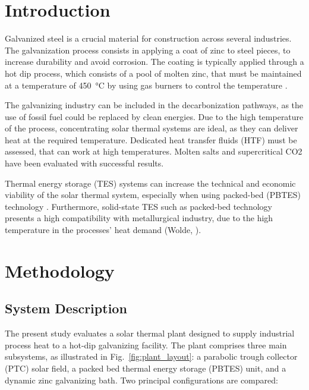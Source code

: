 \documentclass[11pt,review,3p]{elsarticle}
\newcommand{\nomenclaturebox}{%
  \begin{table}[!t] %
    \centering
    \setlength{\fboxsep}{5pt} %
    \doublebox{%
      \begin{minipage}{\textwidth}
        \begin{multicols}{2} %
          \printnomenclature
        \end{multicols}
      \end{minipage}
    }
  \end{table}
}
\begin{document}
\linenumbers


\nomenclaturebox

\section{Introduction}
\label{sec:Intro}
Galvanized steel is a crucial material for construction across several industries. The galvanization process consists in applying a coat of zinc to steel pieces, to increase durability and avoid corrosion. The coating is typically applied through a hot dip process, which consists of a pool of molten zinc, that must be maintained at a temperature of \SI{450}{\celsius} by using gas burners to control the temperature \cite{Blakey2004-sl}.

The galvanizing industry can be included in the decarbonization pathways, as the use of fossil fuel could be replaced by clean energies. Due to the high temperature of the process, concentrating solar thermal systems are ideal, as they can deliver heat at the required temperature. Dedicated heat transfer fluids (HTF) must be assessed, that can work at high temperatures. Molten salts \cite{Bonini2024-za} and supercritical CO2 \cite{Battisti2022-nw} have been evaluated with successful results.

Thermal energy storage (TES) systems can increase the technical and economic viability of the solar thermal system, especially when using packed-bed (PBTES) technology \cite{Battisti2021-wv}. Furthermore, solid-state TES such as packed-bed technology presents a high compatibility with metallurgical industry, due to the high temperature in the processes' heat demand (Wolde, \cite{Wolde2024-dm}).

\section{Methodology}
\label{sec:Methodology}

\subsection{System Description}
\label{sec:sys_desc}

The present study evaluates a solar thermal plant designed to supply industrial process heat to a hot-dip galvanizing facility. The plant comprises three main subsystems, as illustrated in Fig.~\ref{fig:plant_layout}: a parabolic trough collector (PTC) solar field, a packed bed thermal energy storage (PBTES) unit, and a dynamic zinc galvanizing bath. Two principal configurations are compared:
\end{document}
